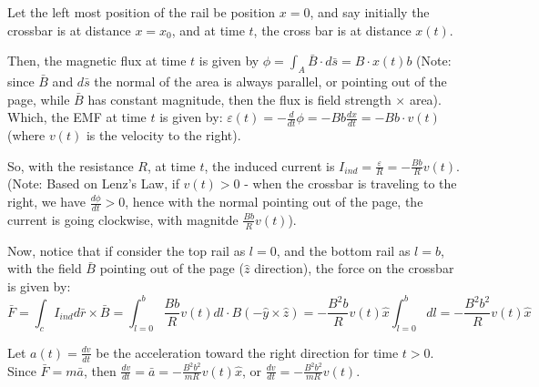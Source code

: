 \documentclass{article}
\begin{document}
Let the left most position of the rail be position $x=0$, and say initially the crossbar is at distance $x=x_0$, and at time $t$, 
the cross bar is at distance $x(t)$.

Then, the magnetic flux at time $t$ is given by $\phi=\int_A\bar{B}\cdot d\bar{s} = B\cdot x(t)b$ 
(Note: since $\bar{B}$ and $d\bar{s}$ the normal of the area is always parallel, or pointing out of the page, while $\bar{B}$ has constant magnitude,
then the flux is field strength $\times$ area).
Which, the EMF at time $t$ is given by: $\varepsilon(t)=-\frac{d}{dt}\phi = -Bb\frac{dx}{dt} = -Bb\cdot v(t)$ (where $v(t)$ is the velocity to the right).

So, with the resistance $R$, at time $t$, the induced current is $I_{ind}=\frac{\varepsilon}{R} = -\frac{Bb}{R}v(t)$.
(Note: Based on Lenz's Law, if $v(t)>0$ - when the crossbar is traveling to the right, we have $\frac{d\phi}{dt}>0$, hence with the normal pointing out of the page,
the current is going clockwise, with magnitde $\frac{Bb}{R}v(t)$).

\hfill

Now, notice that if consider the top rail as $l=0$, and the bottom rail as $l=b$, with the field $\bar{B}$ pointing out of the page ($\hat{z}$ direction), the force on the crossbar is given by:
$$\bar{F}=\int_c I_{ind}d\bar{r}\times \bar{B} = \int_{l=0}^{b}\frac{Bb}{R}v(t)dl \cdot B (-\hat{y}\times \hat{z}) = -\frac{B^2b}{R}v(t)\hat{x}\int_{l=0}^{b}dl = -\frac{B^2b^2}{R}v(t)\hat{x}$$

Let $a(t)=\frac{dv}{dt}$ be the acceleration toward the right direction for time $t>0$. Since $\bar{F}=m\bar{a}$, then $\frac{dv}{dt}=\bar{a}=-\frac{B^2b^2}{mR}v(t)\hat{x}$, or $\frac{dv}{dt}=-\frac{B^2b^2}{mR}v(t)$.

\hfill
\end{document}
